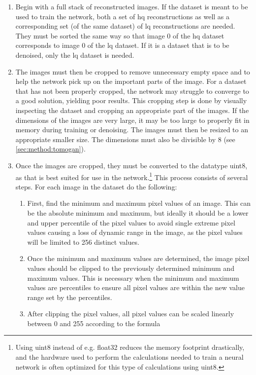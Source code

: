 \begin{enumerate}
    \item Begin with a full stack of reconstructed images. If the dataset is meant to be used to train the network, both a set of \gls{hq} reconstructions as well as a corresponding set (of the same dataset) of \gls{lq} reconstructions are needed. They must be sorted the same way so that image 0 of the \gls{hq} dataset corresponds to image 0 of the \gls{lq} dataset. If it is a dataset that is to be denoised, only the \gls{lq} dataset is needed. 
    \item The images must then be cropped to remove unnecessary empty space and to help the network pick up on the important parts of the image. For a dataset that has not been properly cropped, the network may struggle to converge to a good solution, yielding poor results. This cropping step is done by visually inspecting the dataset and cropping an appropriate part of the images. If the dimensions of the images are very large, it may be too large to properly fit in memory during training or denoising. The images must then be resized to an appropriate smaller size. The dimensions must also be divisible by $8$ (see \cref{sec:method:tomogan}).
    \item Once the images are cropped, they must be converted to the datatype uint8, as that is best suited for use in the network.\footnote{Using uint8 instead of e.g. float32 reduces the memory footprint drastically, and the hardware used to perform the calculations needed to train a neural network is often optimized for this type of calculations using uint8. } This process consists of several steps. For each image in the dataset do the following:
    \begin{enumerate}
        \item First, find the minimum and maximum pixel values of an image. This can be the absolute minimum and maximum, but ideally it should be a lower and upper percentile of the pixel values to avoid single extreme pixel values causing a loss of dynamic range in the image, as the pixel values will be limited to 256 distinct values. 
        \item Once the minimum and maximum values are determined, the image pixel values should be clipped to the previously determined minimum and maximum values. This is necessary when the minimum and maximum values are percentiles to ensure all pixel values are within the new value range set by the percentiles.
        \item After clipping the pixel values, all pixel values can be scaled linearly between 0 and 255 according to the formula 

\end{enumerate}
\end{enumerate}
